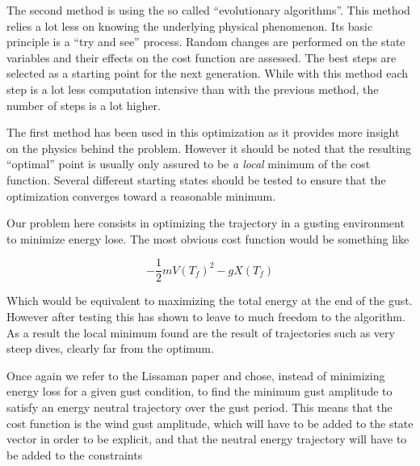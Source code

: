\par The second method is using the so called ``evolutionary algorithms''. 
This method relies a lot less on knowing the underlying physical phenomenon.
Its basic principle is a ``try and see'' process.
Random changes are performed on the state variables and their effects on the cost function are assessed.
The best steps are selected as a starting point for the next generation.
While with this method each step is a lot less computation intensive than with the previous method, the number of steps is a lot higher.

\par The first method has been used in this optimization as it provides more insight on the physics behind the problem.
However it should be noted that the resulting ``optimal'' point is usually only assured to be \emph{a local} minimum of the cost function.
Several different starting states should be tested to ensure that the optimization converges toward a reasonable minimum.



\par Our problem here consists in optimizing the trajectory in a gusting environment to minimize energy lose.
The most obvious cost function would be something like

\begin{equation}
	- \frac{1}{2}m{V(T_f)}^2 - gX(T_f)
	\label{eqn:eni_cost_fun}
\end{equation}

Which would be equivalent to maximizing the total energy at the end of the gust.
However after testing this has shown to leave to much freedom to the algorithm. 
As a result the local minimum found are the result of trajectories such as very steep dives, clearly far from the optimum.

\par Once again we refer to the Lissaman paper \cite{Lissaman2007neutral} and chose, instead of minimizing energy loss for a given gust condition, to find the minimum gust amplitude to satisfy an energy neutral trajectory over the gust period.
This means that the cost function is the wind gust amplitude, which will have to be added to the state vector in order to be explicit, and that the neutral energy trajectory will have to be added to the constraints


